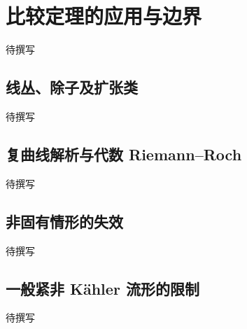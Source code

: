 
% 
% 
% 

\section{比较定理的应用与边界}
\label{g4:sec:2005}

待撰写

\subsection{线丛、除子及扩张类}
\label{g4:subsec:2005:01}
待撰写

\subsection{复曲线解析与代数 Riemann–Roch}
\label{g4:subsec:2005:02}
待撰写

\subsection{非固有情形的失效}
\label{g4:subsec:2005:03}
待撰写

\subsection{一般紧非 Kähler 流形的限制}
\label{g4:subsec:2005:04}
待撰写
